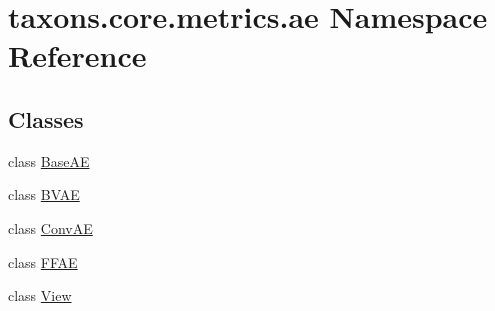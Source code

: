 \hypertarget{namespacetaxons_1_1core_1_1metrics_1_1ae}{}\section{taxons.\+core.\+metrics.\+ae Namespace Reference}
\label{namespacetaxons_1_1core_1_1metrics_1_1ae}
\subsection*{Classes}
\begin{DoxyCompactItemize}
\item 
class \hyperlink{classtaxons_1_1core_1_1metrics_1_1ae_1_1_base_a_e}{Base\+AE}
\item 
class \hyperlink{classtaxons_1_1core_1_1metrics_1_1ae_1_1_b_v_a_e}{B\+V\+AE}
\item 
class \hyperlink{classtaxons_1_1core_1_1metrics_1_1ae_1_1_conv_a_e}{Conv\+AE}
\item 
class \hyperlink{classtaxons_1_1core_1_1metrics_1_1ae_1_1_f_f_a_e}{F\+F\+AE}
\item 
class \hyperlink{classtaxons_1_1core_1_1metrics_1_1ae_1_1_view}{View}
\end{DoxyCompactItemize}
